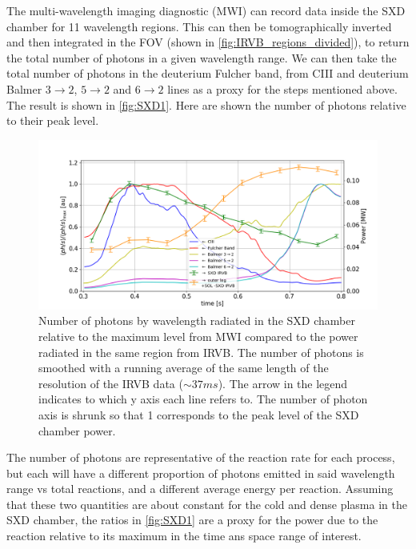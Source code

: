 The multi-wavelength imaging diagnostic (MWI) can record data inside the SXD chamber for 11 wavelength regions.\cite{Feng2021,Perek2019} This can then be tomographically inverted and then integrated in the FOV (shown in \autoref{fig:IRVB_regions_divided}), to return the total number of photons in a given wavelength range. We can then take the total number of photons in the deuterium Fulcher band, from CIII and deuterium Balmer $3 \rightarrow 2$, $5 \rightarrow 2$ and $6 \rightarrow 2$ lines as a proxy for the steps mentioned above. The result is shown in \autoref{fig:SXD1}. Here are shown the number of photons relative to their peak level.
\begin{figure}
	\centering
	\includegraphics[trim={40 0 25 50},clip,width=1\linewidth]{Chapters/chapter2/figs/IRVB-MASTU_shot-45371_pass1_bin7x3x3_gridres2cm_all_variables_absolute_small5.png}
	\caption{Number of photons by wavelength radiated in the SXD chamber relative to the maximum level from MWI compared to the power radiated in the same region from IRVB. The number of photons is smoothed with a running average of the same length of the resolution of the IRVB data ($\sim37ms$). The arrow in the legend indicates to which y axis each line refers to. The number of photon axis is shrunk so that 1 corresponds to the peak level of the SXD chamber power.}
	\label{fig:SXD1}
\end{figure}
The number of photons are representative of the reaction rate for each process, but each will have a different proportion of photons emitted in said wavelength range vs total reactions, and a different average energy per reaction. Assuming that these two quantities are about constant for the cold and dense plasma in the SXD chamber, the ratios in \autoref{fig:SXD1} are a proxy for the power due to the reaction relative to its maximum in the time ans space range of interest.

